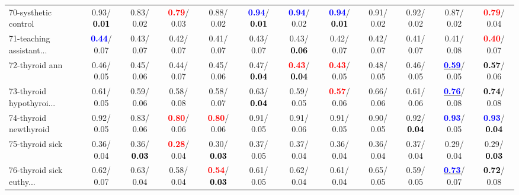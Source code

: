 \begin{table}[h]
\begin{center}
{\begin{tabular}{lc|c|c|c|c|c|c|c|c|c|c}
70-systhetic control &   0.93/\textcolor{black}{\textbf{  0.01}} &   0.83/  0.02 & \textcolor{red}{\textbf{  0.79}}/  0.03 &   0.88/  0.02 & \textcolor{blue}{\textbf{  0.94}}/\textcolor{black}{\textbf{  0.01}} & \textcolor{blue}{\textbf{  0.94}}/  0.02 & \textcolor{blue}{\textbf{  0.94}}/\textcolor{black}{\textbf{  0.01}} &   0.91/  0.02 &   0.92/  0.02 &   0.87/  0.02 & \textcolor{red}{\textbf{  0.79}}/  0.04 \\
71-teaching assistant... & \textcolor{blue}{\textbf{  0.44}}/  0.07 &   0.43/  0.07 &   0.42/  0.07 &   0.41/  0.07 &   0.43/  0.07 &   0.43/\textcolor{black}{\textbf{  0.06}} &   0.42/  0.07 &   0.42/  0.07 &   0.41/  0.07 &   0.41/  0.08 & \textcolor{red}{\textbf{  0.40}}/  0.07 \\ \hline
72-thyroid ann &   0.46/  0.05 &   0.45/  0.06 &   0.44/  0.07 &   0.45/  0.06 &   0.47/\textcolor{black}{\textbf{  0.04}} & \textcolor{red}{\textbf{  0.43}}/\textcolor{black}{\textbf{  0.04}} & \textcolor{red}{\textbf{  0.43}}/  0.05 &   0.48/  0.05 &   0.46/  0.05 & \underline{\textcolor{blue}{\textbf{  0.59}}}/  0.05 & \textcolor{black}{\textbf{  0.57}}/  0.06 \\
73-thyroid hypothyroi... &   0.61/  0.05 &   0.59/  0.06 &   0.58/  0.08 &   0.58/  0.07 &   0.63/\textcolor{black}{\textbf{  0.04}} &   0.59/  0.05 & \textcolor{red}{\textbf{  0.57}}/  0.06 &   0.66/  0.06 &   0.61/  0.06 & \underline{\textcolor{blue}{\textbf{  0.76}}}/  0.08 & \textcolor{black}{\textbf{  0.74}}/  0.08 \\
74-thyroid newthyroid &   0.92/  0.05 &   0.83/  0.06 & \textcolor{red}{\textbf{  0.80}}/  0.06 & \textcolor{red}{\textbf{  0.80}}/  0.06 &   0.91/  0.05 &   0.91/  0.06 &   0.91/  0.05 &   0.90/  0.05 &   0.92/\textcolor{black}{\textbf{  0.04}} & \textcolor{blue}{\textbf{  0.93}}/  0.05 & \textcolor{blue}{\textbf{  0.93}}/\textcolor{black}{\textbf{  0.04}} \\
75-thyroid sick &   0.36/  0.04 &   0.36/\textcolor{black}{\textbf{  0.03}} & \textcolor{red}{\textbf{  0.28}}/  0.04 &   0.30/\textcolor{black}{\textbf{  0.03}} &   0.37/  0.05 &   0.37/  0.04 &   0.36/  0.04 &   0.36/  0.04 &   0.37/  0.04 &   0.29/  0.04 &   0.29/\textcolor{black}{\textbf{  0.03}} \\
76-thyroid sick euthy... &   0.62/  0.07 &   0.63/  0.04 &   0.58/  0.04 & \textcolor{red}{\textbf{  0.54}}/\textcolor{black}{\textbf{  0.03}} &   0.61/  0.05 &   0.62/  0.04 &   0.61/  0.04 &   0.65/  0.05 &   0.59/  0.05 & \underline{\textcolor{blue}{\textbf{  0.73}}}/  0.07 & \textcolor{black}{\textbf{  0.72}}/  0.08 \\

\end{tabular}}
\end{center}
\end{table}
